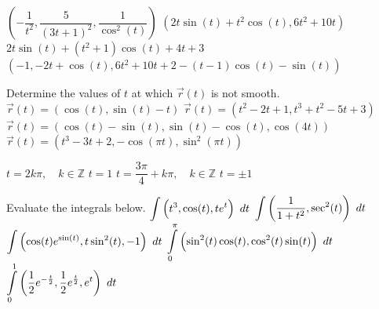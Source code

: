 \begin{Answer}
    
        \Question $\left(-\dfrac{1}{t^2}, \dfrac{5}{(3t+1)^2}, \dfrac{1}{\cos^2(t)}  \right)  $
        \Question  $\left(2t\sin (t) + t^2 \cos(t), 6t^2+10t  \right)  $
        \Question  $2 t \sin (t) +  \left(t^2+1 \right) \cos(t)+ 4t+3   $
        \Question $\left(-1,-2t + \cos(t), 6t^2+10t+2-(t-1)\cos(t)-\sin(t) \right)  $ 
      
\end{Answer}

\begin{Exercise} Determine the values of $t$ at which $\vec r(t)$ is not smooth. %
        \Question[difficulty=1] $\vec r(t) = \left(\cos (t), \sin(t) - t \right)  $
        \Question[difficulty=1] $\vec r(t) = \left(t^2-2t+1, t^3+t^2-5t+3 \right)  $
        \Question[difficulty=2] $\vec r(t) = \left(\cos (t) - \sin(t), \sin(t) - \cos(t), \cos \left(4t\right) \right)  $
        \Question[difficulty=2] $\vec r(t) = \left(t^3-3t+2, - \cos \left(\pi t \right), \sin^2 \left(\pi t \right) \right)  $
\end{Exercise}

\begin{Answer}
    \begin{multicols}{2}
        
        \Question $t=2k\pi, \quad k \in \mathbb{Z} $
        \Question $t=1$
        \Question $t=\dfrac{3 \pi}{4} + k\pi, \quad k \in \mathbb{Z}$
        \Question $t=\pm1$ 
        \EndCurrentQuestion
    \end{multicols}
\end{Answer}


\begin{Exercise} Evaluate the integrals below.
        \Question[difficulty=1] $\displaystyle \int\limits  \left(t^3, \cos(t), te^t  \right) \ dt$ %
        \Question[difficulty=1] $\displaystyle \int\limits  \left(\dfrac{1}{1+t^2}, \sec^2(t)\right) \ dt$  
        \Question[difficulty=2] $\displaystyle \int \left(\cos (t) e^{\sin(t)}, t \sin^2(t), -1 \right)\ dt$ 
        \Question[difficulty=2] $\displaystyle \int\limits_0^{\pi} \left(\sin^2(t) \cos (t), \cos^2(t) \sin(t)\right) \ dt$ 
        \Question[difficulty=1] $\displaystyle \int\limits_0^{1} \left(\dfrac{1}{2} e^{-\frac{t}{2}}, \dfrac{1}{2} e^{\frac{t}{2}}, e^t\right) \ dt$ 
\end{Exercise}

